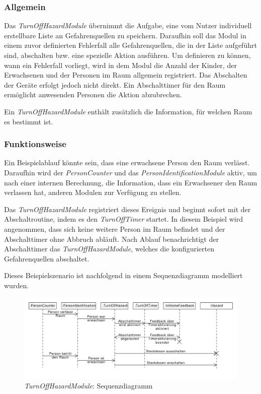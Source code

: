 \subsubsection{Allgemein}
Das \emph{TurnOffHazardModule} übernimmt die Aufgabe, eine vom Nutzer individuell erstellbare Liste an Gefahrenquellen zu speichern. Daraufhin soll das Modul in einem zuvor definierten Fehlerfall alle Gefahrenquellen, die in der Liste aufgeführt sind, abschalten bzw. eine spezielle Aktion ausführen. Um definieren zu können, wann ein Fehlerfall vorliegt, wird in dem Modul die Anzahl der Kinder, der Erwachsenen und der Personen im Raum allgemein registriert. Das Abschalten der Geräte erfolgt jedoch nicht direkt. Ein Abschalttimer für den Raum ermöglicht anwesenden Personen die Aktion abzubrechen.

Ein \emph{TurnOffHazardModule} enthält zusätzlich die Information, für welchen Raum es bestimmt ist.

\subsubsection{Funktionsweise}
Ein Beispielablauf könnte sein, dass eine erwachsene Person den Raum verlässt. Daraufhin wird der \emph{PersonCounter} und das \emph{PersonIdentificationModule} aktiv, um nach einer internen Berechnung, die Information, dass ein Erwachsener den Raum verlassen hat, anderen Modulen zur Verfügung zu stellen.

Das \emph{TurnOffHazardModule} registriert dieses Ereignis und beginnt sofort mit der Abschaltroutine, indem es den \emph{TurnOffTimer} startet. In diesem Beispiel wird angenommen, dass sich keine weitere Person im Raum befindet und der Abschalttimer ohne Abbruch abläuft. Nach Ablauf benachrichtigt der Abschalttimer das \emph{TurnOffHazardModule}, welches die konfigurierten Gefahrenquellen abschaltet.

\newpage

Dieses Beispielszenario ist nachfolgend in einem Sequenzdiagramm modelliert wurden.

\begin{figure}[h!]
	\centering
	\includegraphics[width=\textwidth]{img/Modulkonzeption/TurnOffHazardSequence.pdf}
	\caption{\emph{TurnOffHazardModule}: Sequenzdiagramm}
	\label{fig:turnOffHazard}
\end{figure}

